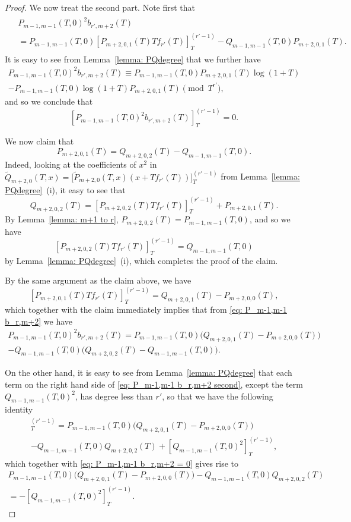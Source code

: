\documentclass[11pt]{amsart}
\theoremstyle{definition}
\numberwithin{equation}{subsection}
\theoremstyle{plain}
\theoremstyle{plain}
\theoremstyle{plain}
\theoremstyle{plain}
\theoremstyle{plain}
\theoremstyle{plain}
\theoremstyle{plain}
\theoremstyle{plain}
\theoremstyle{plain}
\theoremstyle{plain}
\theoremstyle{plain}
\theoremstyle{plain}
\theoremstyle{definition}
\theoremstyle{definition}
\theoremstyle{definition}
\theoremstyle{remark}
\renewcommand{\(}{\textup{(}}
\renewcommand{\)}{\textup{)}}
\begin{document}
\begin{proof}
We now treat the second part. Note first that
    \begin{align}\label{eq: P_m-1,m-1 b_r,m+2}
    \begin{split}
    &P_{m-1,m-1}(T,0)^2b_{r',m+2}(T)\\
        &=
        P_{m-1,m-1}(T,0)[P_{m+2,0,1}(T)Tf_{r'}(T)]_{T}^{(r'-1)}
        -Q_{m-1,m-1}(T,0)P_{m+2,0,1}(T).
    \end{split}
    \end{align}
It is easy to see from Lemma~\ref{lemma: PQdegree} that we further have
    \begin{multline*}
    P_{m-1,m-1}(T,0)^2b_{r',m+2}(T)\equiv
        P_{m-1,m-1}(T,0)P_{m+2,0,1}(T)\log(1+T)\\
         -P_{m-1,m-1}(T,0)\log(1+T)P_{m+2,0,1}(T)\pmod{T^{r'}},
    \end{multline*}
and so we conclude that
\begin{equation}\label{eq: P_m-1,m-1 b_r,m+2 = 0}
[P_{m-1,m-1}(T,0)^2b_{r',m+2}(T)]_{T}^{(r'-1)}=0.
\end{equation}


We now claim that
 $$P_{m+2,0,1}(T)=Q_{m+2,0,2}(T)-Q_{m-1,m-1}(T,0).$$
Indeed, looking at the coefficients of $x^2$ in $\tilde Q_{m+2,0}(T,x)=\big[\tilde P_{m+2,0}(T,x)(x+Tf_{r'}(T))\big]_{T}^{(r'-1)}$ from Lemma~\ref{lemma: PQdegree}~(i), it easy to see that
$$Q_{m+2,0,2}(T)=[P_{m+2,0,2}(T)Tf_{r'}(T)]_T^{(r'-1)}+P_{m+2,0,1}(T).$$
By Lemma~\ref{lemma: m+1 to r}, $P_{m+2,0,2}(T)=P_{m-1,m-1}(T,0)$, and so we have $$[P_{m+2,0,2}(T)Tf_{r'}(T)]_T^{(r'-1)}=Q_{m-1,m-1}(T,0)$$ by Lemma~\ref{lemma: PQdegree}~(i), which completes the proof of the claim.


By the same argument as the claim above, we have $$[P_{m+2,0,1}(T)Tf_{r'}(T)]_{T}^{(r'-1)}=Q_{m+2,0,1}(T)-P_{m+2,0,0}(T),$$ which together with the claim immediately implies that from \eqref{eq: P_m-1,m-1 b_r,m+2} we have
\begin{multline}\label{eq: P_m-1,m-1 b_r,m+2 second}
    P_{m-1,m-1}(T,0)^2b_{r',m+2}(T)=
        P_{m-1,m-1}(T,0)\big(Q_{m+2,0,1}(T)-P_{m+2,0,0}(T)\big)  \\
        -Q_{m-1,m-1}(T,0)\big(Q_{m+2,0,2}(T)-Q_{m-1,m-1}(T,0)\big).
\end{multline}

On the other hand, it is easy to see from Lemma~\ref{lemma: PQdegree} that each term on the right hand side of \eqref{eq: P_m-1,m-1 b_r,m+2 second}, except the term $Q_{m-1,m-1}(T,0)^2$, has degree less than $r'$, so that we have the following identity
\begin{multline*}
    [P_{m-1,m-1}(T,0)^2b_{r',m+2}(T)]_{T}^{(r'-1)}= P_{m-1,m-1}(T,0)\big(Q_{m+2,0,1}(T)-P_{m+2,0,0}(T)\big)\\
     -Q_{m-1,m-1}(T,0)Q_{m+2,0,2}(T) +[Q_{m-1,m-1}(T,0)^2]_{T}^{(r'-1)},
\end{multline*}
which together with \eqref{eq: P_m-1,m-1 b_r,m+2 = 0} gives rise to
\begin{multline*}
P_{m-1,m-1}(T,0)\big(Q_{m+2,0,1}(T)-P_{m+2,0,0}(T)\big)
     -Q_{m-1,m-1}(T,0)Q_{m+2,0,2}(T)\\=-[Q_{m-1,m-1}(T,0)^2]_{T}^{(r'-1)}.
\end{multline*}


\end{proof}
\end{document}
